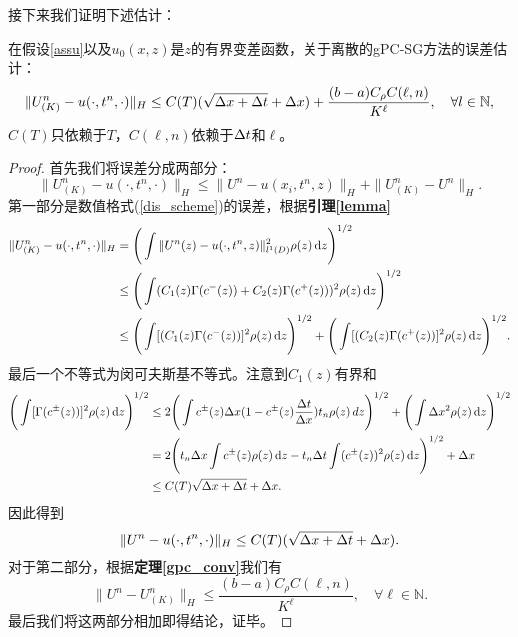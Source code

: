 接下来我们证明下述估计：
\begin{thm}
  在假设\ref{assu}以及$u_0(x, z)$是$z$的有界变差函数，关于离散的gPC-SG方法的误差估计：
  \begin{equation}
    \|U^n_{(K)} - u(\cdot, t^n, \cdot)\|_H \leq C(T)(\sqrt{\Delta x + \Delta t} + \Delta x) + \frac{(b-a)C_\rho C(\ell,n)}{K^\ell}, \quad\forall l\in\mathbb{N},
  \end{equation}
  $C(T)$只依赖于$T$，$C(\ell,n)$依赖于$\Delta t$和$\ell$。
\end{thm}
\begin{proof}
  首先我们将误差分成两部分：
  \begin{equation}
    \|U^n_{(K)} - u(\cdot, t^n, \cdot)\|_H \leq \|U^n - u(x_i, t^n, z)\|_H + \|U^n_{(K)} - U^n\|_H.
  \end{equation}
  第一部分是数值格式(\ref{dis_scheme})的误差，根据{\bf 引理\ref{lemma}}
  \begin{equation}
    \begin{split}
      \|U^n_{(K)} - u(\cdot, t^n, \cdot)\|_H &= \Bigg(\int\|U^{n}(z) - u(\cdot, t^n, z)\|_{l^1(D)}^2\rho(z)\mathop{}\!\mathrm{d} z\Bigg)^{1/2} \\
      & \leq \Bigg(\int (C_1(z)\Gamma(c^-(z)) + C_2(z)\Gamma(c^+(z)))^2\rho(z)\mathop{}\!\mathrm{d} z\Bigg)^{1/2} \\
      & \leq \Bigg(\int [(C_1(z)\Gamma(c^-(z))]^2\rho(z)\mathop{}\!\mathrm{d} z\Bigg)^{1/2} + \Bigg(\int [(C_2(z)\Gamma(c^+(z))]^2\rho(z)\mathop{}\!\mathrm{d} z\Bigg)^{1/2}.
    \end{split}
  \end{equation}
  最后一个不等式为闵可夫斯基不等式。注意到$C_1(z)$有界和
  \begin{equation}
    \begin{split}
      \Bigg(\int [\Gamma(c^{\pm}(z))]^2\rho(z)\mathop{}\!\mathrm{d} z\Bigg)^{1/2} & \leq 2\Bigg(\int c^{\pm}(z)\Delta x(1-c^{\pm}(z)\frac{\Delta t}{\Delta x})t_n\rho(z)\,dz\Bigg)^{1/2} + \Bigg(\int \Delta x^2\rho(z)\mathop{}\!\mathrm{d} z\Bigg)^{1/2} \\
      &= 2\Bigg(t_n\Delta x\int c^{\pm}(z)\rho(z)\mathop{}\!\mathrm{d} z - t_n\Delta t\int (c^{\pm}(z))^2\rho(z)\mathop{}\!\mathrm{d} z\Bigg)^{1/2} + \Delta x \\
      &\leq C(T)\sqrt{\Delta x + \Delta t} + \Delta x.
    \end{split}
  \end{equation}
  因此得到
  \begin{equation}\label{err1}
    \|U^{n}- u(\cdot, t^n, \cdot)\|_H \leq C(T)(\sqrt{\Delta x + \Delta t} + \Delta x).
  \end{equation}
  对于第二部分，根据{\bf 定理\ref{gpc_conv}}我们有
  \begin{equation}
    \|U^n - U^n_{(K)}\|_H \leq \frac{(b-a)C_\rho C(\ell,n)}{K^\ell}, \quad\forall\ell\in\mathbb{N}.
  \end{equation}
  最后我们将这两部分相加即得结论，证毕。
\end{proof}


